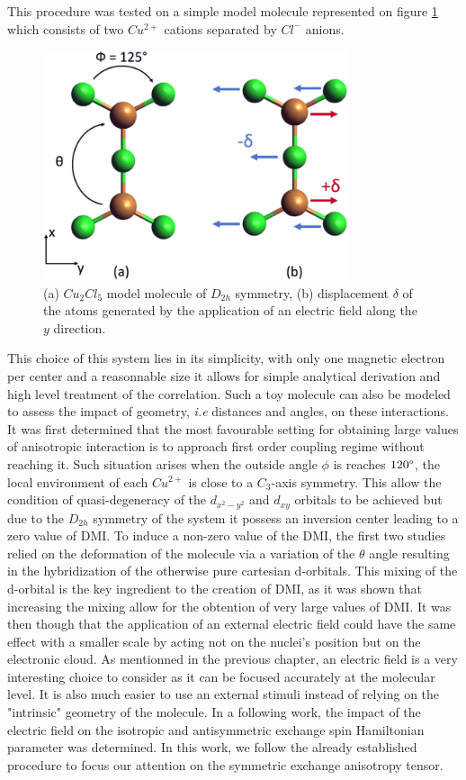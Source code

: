 \documentclass[10pt]{report}
\numberwithin{equation}{section}
\begin{document}
This procedure was tested on a simple model molecule represented on figure \ref{MolCu2Cl5} which consists of two $Cu^{2+}$ cations separated by $Cl^-$ anions.
\begin{figure}[h!]
    \centering
    \includegraphics[width=0.8\textwidth]{Images/Cu2Cl5.png}
    \caption{(a) $Cu_2Cl_5$ model molecule of $D_{2h}$ symmetry, (b) displacement $\delta$ of the atoms generated by the application of an electric field along the $y$ direction.}
    \label{MolCu2Cl5}
\end{figure}


This choice of this system lies in its simplicity, with only one magnetic electron per center and a reasonnable size it allows for simple analytical derivation and high level treatment of the correlation.
Such a toy molecule can also be modeled to assess the impact of geometry, \textit{i.e} distances and angles, on these interactions.
It was first determined that the most favourable setting for obtaining large values of anisotropic interaction is to approach first order coupling regime without reaching it.
Such situation arises when the outside angle $\phi$ is reaches $120 \degree$, the local environment of each $Cu^{2+}$ is close to a $C_3$-axis symmetry.
This allow the condition of quasi-degeneracy of the $d_{x^2-y^2}$ and $d_{xy}$ orbitals to be achieved but due to the $D_{2h}$ symmetry of the system it possess an inversion center leading to a zero value of DMI.
To induce a non-zero value of the DMI, the first two studies relied on the deformation of the molecule via a variation of the $\theta$ angle resulting in the hybridization of the otherwise pure cartesian d-orbitals.
This mixing of the d-orbital is the key ingredient to the creation of DMI, as it was shown that increasing the mixing allow for the obtention of very large values of DMI.
It was then though that the application of an external electric field could have the same effect with a smaller scale by acting not on the nuclei's position but on the electronic cloud.
As mentionned in the previous chapter, an electric field is a very interesting choice to consider as it can be focused accurately at the molecular level. 
It is also much easier to use an external stimuli instead of relying on the "intrinsic" geometry of the molecule.
In a following work, the impact of the electric field on the isotropic and antisymmetric exchange spin Hamiltonian parameter was determined.
In this work, we follow the already established procedure to focus our attention on the symmetric exchange anisotropy tensor.
\end{document}

